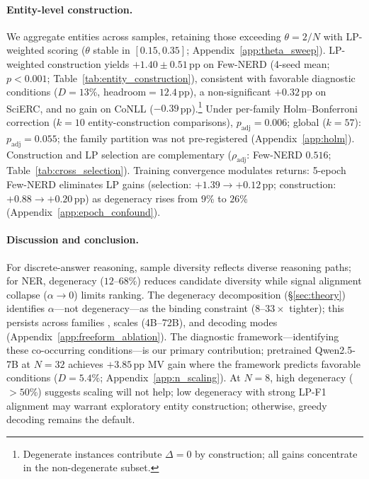 \paragraph{Entity-level construction.}
We aggregate entities across samples, retaining those exceeding $\theta{=}2/N$ with LP-weighted scoring ($\theta$ stable in $[0.15, 0.35]$; Appendix~\ref{app:theta_sweep}).
LP-weighted construction yields $+1.40{\pm}0.51$\,pp on Few-NERD (4-seed mean; $p{<}0.001$; Table~\ref{tab:entity_construction}), consistent with favorable diagnostic conditions ($D{=}13$\%, headroom${=}12.4$\,pp), a non-significant $+0.32$\,pp on SciERC, and no gain on CoNLL ($-0.39$\,pp).\footnote{Degenerate instances contribute $\Delta{=}0$ by construction; all gains concentrate in the non-degenerate subset.}
Under per-family Holm--Bonferroni \cite{holm1979simple} correction ($k{=}10$ entity-construction comparisons), $p_{\text{adj}}{=}0.006$; global ($k{=}57$): $p_{\text{adj}}{=}0.055$; the family partition was not pre-registered (Appendix~\ref{app:holm}).
Construction and LP selection are complementary ($\rho_{\text{adj}}$: Few-NERD $0.516$; Table~\ref{tab:cross_selection}).
Training convergence modulates returns: 5-epoch Few-NERD eliminates LP gains (selection: $+1.39{\to}+0.12$\,pp; construction: $+0.88{\to}+0.20$\,pp) as degeneracy rises from $9$\% to $26$\% (Appendix~\ref{app:epoch_confound}).

\label{sec:selection_results}

\paragraph{Discussion and conclusion.}\label{sec:discussion}\label{sec:selection_method}\label{sec:conclusion}
For discrete-answer reasoning, sample diversity reflects diverse reasoning paths; for NER, degeneracy ($12$--$68$\%) reduces candidate diversity while signal alignment collapse ($\alpha{\to}0$) limits ranking.
The degeneracy decomposition (\S\ref{sec:theory}) identifies $\alpha$---not degeneracy---as the binding constraint ($8$--$33{\times}$ tighter); this persists across families \cite{yun2025price}, scales (4B--72B), and decoding modes (Appendix~\ref{app:freeform_ablation}).
The diagnostic framework---identifying these co-occurring conditions---is our primary contribution; pretrained Qwen2.5-7B at $N{=}32$ achieves $+3.85$\,pp MV gain where the framework predicts favorable conditions ($D{=}5.4$\%; Appendix~\ref{app:n_scaling}).
At $N{=}8$, high degeneracy ($>50$\%) suggests scaling will not help; low degeneracy with strong LP-F1 alignment may warrant exploratory entity construction; otherwise, greedy decoding remains the default.
